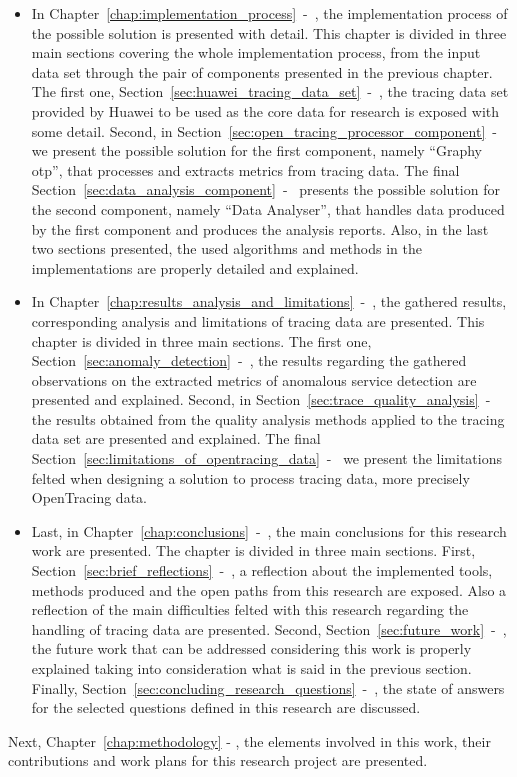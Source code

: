 \begin{itemize}
    \item In Chapter~\ref{chap:implementation_process}~-~, the implementation process of the possible solution is presented with detail. This chapter is divided in three main sections covering the whole implementation process, from the input data set through the pair of components presented in the previous chapter. The first one, Section~\ref{sec:huawei_tracing_data_set}~-~, the tracing data set provided by Huawei to be used as the core data for research is exposed with some detail. Second, in Section~\ref{sec:open_tracing_processor_component}~-~ we present the possible solution for the first component, namely ``Graphy \gls{otp}'', that processes and extracts metrics from tracing data. The final Section~\ref{sec:data_analysis_component}~-~ presents the possible solution for the second component, namely ``Data Analyser'', that handles data produced by the first component and produces the analysis reports. Also, in the last two sections presented, the used algorithms and methods in the implementations are properly detailed and explained.
    \item In Chapter~\ref{chap:results_analysis_and_limitations}~-~, the gathered results, corresponding analysis and limitations of tracing data are presented. This chapter is divided in three main sections. The first one, Section~\ref{sec:anomaly_detection}~-~, the results regarding the gathered observations on the extracted metrics of anomalous service detection are presented and explained. Second, in Section~\ref{sec:trace_quality_analysis}~-~ the results obtained from the quality analysis methods applied to the tracing data set are presented and explained. The final Section~\ref{sec:limitations_of_opentracing_data}~-~ we present the limitations felted when designing a solution to process tracing data, more precisely OpenTracing data.
    \item Last, in Chapter~\ref{chap:conclusions}~-~, the main conclusions for this research work are presented. The chapter is divided in three main sections. First, Section~\ref{sec:brief_reflections}~-~, a reflection about the implemented tools, methods produced and the open paths from this research are exposed. Also a reflection of the main difficulties felted with this research regarding the handling of tracing data are presented. Second, Section~\ref{sec:future_work}~-~, the future work that can be addressed considering this work is properly explained taking into consideration what is said in the previous section. Finally, Section~\ref{sec:concluding_research_questions}~-~, the state of answers for the selected questions defined in this research are discussed.
\end{itemize}

Next, Chapter~\ref{chap:methodology} - , the elements involved in this work, their contributions and work plans for this research project are presented.

\checkoddpage
{}
{ %
    \newpage
    \blankpage}
{ %
}